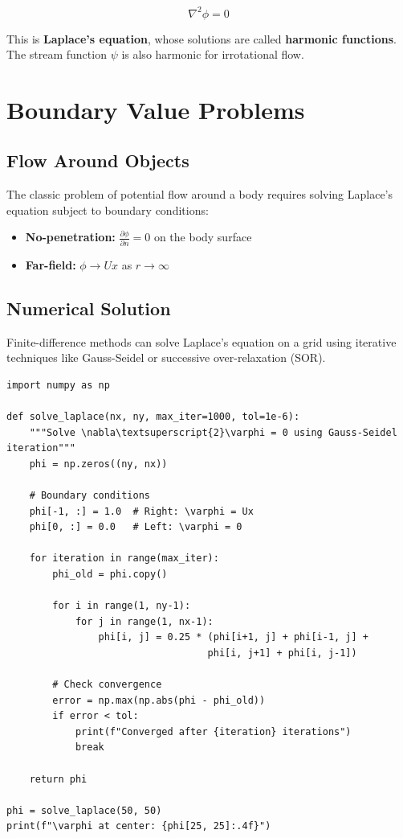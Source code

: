 \[
\nabla^2 \phi = 0
\]

This is \textbf{Laplace's equation}, whose solutions are called \textbf{harmonic functions}. The stream function $\psi$ is also harmonic for irrotational flow.

\section{Boundary Value Problems}

\subsection{Flow Around Objects}

The classic problem of potential flow around a body requires solving Laplace's equation subject to boundary conditions:

\begin{itemize}
    \item \textbf{No-penetration:} $\frac{\partial \phi}{\partial n} = 0$ on the body surface
    \item \textbf{Far-field:} $\phi \to Ux$ as $r \to \infty$
\end{itemize}

\subsection{Numerical Solution}

Finite-difference methods can solve Laplace's equation on a grid using iterative techniques like Gauss-Seidel or successive over-relaxation (SOR).

\begin{lstlisting}[caption={Solving Laplace's equation}, label=lst:laplace]
import numpy as np

def solve_laplace(nx, ny, max_iter=1000, tol=1e-6):
    """Solve \nabla\textsuperscript{2}\varphi = 0 using Gauss-Seidel iteration"""
    phi = np.zeros((ny, nx))
    
    # Boundary conditions
    phi[-1, :] = 1.0  # Right: \varphi = Ux
    phi[0, :] = 0.0   # Left: \varphi = 0
    
    for iteration in range(max_iter):
        phi_old = phi.copy()
        
        for i in range(1, ny-1):
            for j in range(1, nx-1):
                phi[i, j] = 0.25 * (phi[i+1, j] + phi[i-1, j] + 
                                   phi[i, j+1] + phi[i, j-1])
        
        # Check convergence
        error = np.max(np.abs(phi - phi_old))
        if error < tol:
            print(f"Converged after {iteration} iterations")
            break
    
    return phi

phi = solve_laplace(50, 50)
print(f"\varphi at center: {phi[25, 25]:.4f}")
\end{lstlisting}

